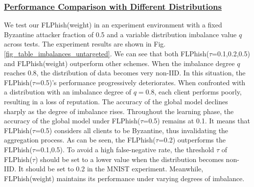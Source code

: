 \documentclass[journal]{IEEEtran}
\begin{document}
    \subsubsection{\ul{Performance Comparison with Different Distributions}} We test our FLPhish(weight) in an experiment environment with a fixed Byzantine attacker fraction of 0.5 and a variable distribution imbalance value $q$ across tests. The experiment results are shown in Fig. \ref{fig_table_imbalances_untargeted}. We can see that both FLPhish($\tau$=0.1,0.2,0.5) and FLPhish(weight) outperform other schemes. When the imbalance degree $q$ reaches 0.8, the distribution of data becomes very non-IID. In this situation, the FLPhish($\tau$=0.5)'s performance progressively deteriorates. When confronted with a distribution with an imbalance degree of $q=0.8$, each client performs poorly, resulting in a loss of reputation. The accuracy of the global model declines sharply as the degree of imbalance rises. Throughout the learning phase, the accuracy of the global model under FLPhish($\tau$=0.5) remains at 0.1. It means that FLPhish($\tau$=0.5) considers all clients to be Byzantine, thus invalidating the aggregation process. As can be seen, the FLPhish($\tau$=0.2) outperforms the FLPhish($\tau$=0.1,0.5). To avoid a high false-negative rate, the threshold $\tau$ of FLPhish($\tau$) should be set to a lower value when the distribution becomes non-IID. It should be set to 0.2 in the MNIST experiment. Meanwhile, FLPhish(weight) maintains its performance under varying degrees of imbalance.
    
\end{document}
